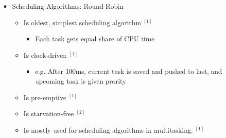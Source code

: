 \documentclass[12pt]{article}
\begin{document}
\begin{itemize}
    \item Scheduling Algorithms: Round Robin
    \begin{itemize}
        \item Is oldest, simplest scheduling algorithm $^{[1]}$
        \begin{itemize}
            \item Each task gets equal share of CPU time
        \end{itemize}
        \item Is clock-driven $^{[1]}$
        \begin{itemize}
            \item e.g. After 100ms, current task is saved and pushed to last, and
            upcoming task is given prority
        \end{itemize}
        \item Is pre-emptive $^{[1]}$
        \item Is starvation-free $^{[2]}$
        \item Is mostly used for scheduling algorithms in multitasking. $^{[1]}$
    \end{itemize}

    \bigskip


\end{itemize}
\end{document}

